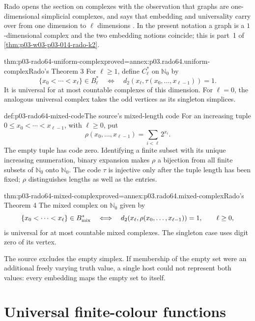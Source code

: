 Rado opens the section on complexes with the observation that graphs are
one-dimensional simplicial complexes, and says that embedding and
universality carry over from one dimension to \(\ell\) dimensions
\cite[\S2.1, p.~333]{Rado1964}. In the present notation a graph is a
\(1\)-dimensional complex and the two embedding notions coincide; this is
part~1 of \cref{thm:p03-w03-p03-014-rado-k2}.

\begin{hbtheorem}{thm:p03-rado64-uniform-complex}{proved=annex:p03.rado64.uniform-complex}{Rado's Theorem 3}
For \(\ell\geq1\), define \(C_\ell^*\) on \(\mathbb N_0\) by
\[
 \{x_0<\cdots<x_\ell\}\in B_\ell^*
 \quad\Longleftrightarrow\quad
 d_2(x_\ell,\tau(x_0,\ldots,x_{\ell-1}))=1.
\]
It is universal for at most countable complexes of this dimension.
For \(\ell=0\), the analogous universal complex takes the odd vertices
as its singleton simplices.
\end{hbtheorem}

\begin{hbdefinition}{def:p03-rado64-mixed-code}{The source's mixed-length code}
For an increasing tuple \(0\leq x_0<\cdots<x_{\ell-1}\), with
\(\ell\geq0\), put
\[
 \rho(x_0,\ldots,x_{\ell-1})=\sum_{i<\ell}2^{x_i}.
\]
The empty tuple has code zero. Identifying a finite subset with its unique
increasing enumeration, binary expansion makes \(\rho\) a bijection from
all finite subsets of \(\mathbb N_0\) onto \(\mathbb N_0\).
The code \(\tau\) is injective only after the tuple length has been fixed;
\(\rho\) distinguishes lengths as well as the entries.
\end{hbdefinition}

\begin{hbtheorem}{thm:p03-rado64-mixed-complex}{proved=annex:p03.rado64.mixed-complex}{Rado's Theorem 4}
The mixed complex on \(\mathbb N_0\) given by
\[
 \{x_0<\cdots<x_\ell\}\in B_{\rm mix}^*
 \quad\Longleftrightarrow\quad
 d_2(x_\ell,\rho(x_0,\ldots,x_{\ell-1}))=1,\qquad\ell\geq0,
\]
is universal for at most countable mixed complexes.
The singleton case uses digit zero of its vertex.
\end{hbtheorem}

The source excludes the empty simplex. If membership of the empty set were
an additional freely varying truth value, a single host could not represent
both values: every embedding maps the empty set to itself.

\section{Universal finite-colour functions}
\label{sec:p03-rado64-finite-functions}


